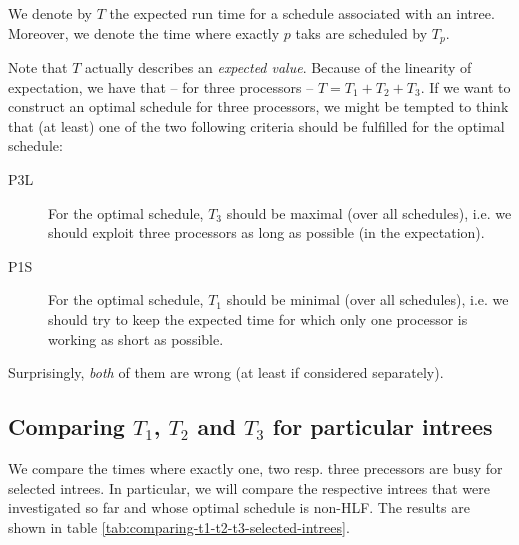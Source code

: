 \begin{definition}
  We denote by $T$ the expected run time for a schedule associated with an intree. 
  Moreover, we denote the time where exactly $p$ taks are scheduled by $T_p$.
\end{definition}

Note that $T$ actually describes an \emph{expected value}. Because of the linearity of expectation, we have that -- for three processors -- $T=T_1 + T_2 + T_3$. If we want to construct an optimal schedule for three processors, we might be tempted to think that (at least) one of the two following criteria should be fulfilled for the optimal schedule:

\begin{description}
\item[P3L] For the optimal schedule, $T_3$ should be maximal (over all schedules), i.e. we should exploit three processors as long as possible (in the expectation).
\item[P1S] For the optimal schedule, $T_1$ should be minimal (over all schedules), i.e. we should try to keep the expected time for which only one processor is working as short as possible.
\end{description}

Surprisingly, \emph{both} of them are wrong (at least if considered separately).

\subsection{Comparing $T_1$, $T_2$ and $T_3$ for particular intrees}
\label{sec:comparing-t1-t2-t3-particular-intrees}

We compare the times where exactly one, two resp. three precessors are busy for selected intrees. In particular, we will compare the respective intrees that were investigated so far and whose optimal schedule is non-HLF. The results are shown in table \ref{tab:comparing-t1-t2-t3-selected-intrees}.

